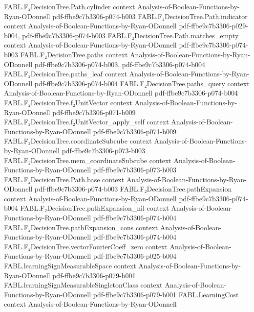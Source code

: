 \begin{theorem}
\proofstep
  {FABL.F₂DecisionTree.Path.cylinder}
  {context}
  {Analysis-of-Boolean-Functions-by-Ryan-ODonnell}
  {pdf-ffbe9c7b3306-p074-b003}
\proofstep
  {FABL.F₂DecisionTree.Path.indicator}
  {context}
  {Analysis-of-Boolean-Functions-by-Ryan-ODonnell}
  {pdf-ffbe9c7b3306-p029-b004,
    pdf-ffbe9c7b3306-p074-b003}
\proofstep
  {FABL.F₂DecisionTree.Path.matches_empty}
  {context}
  {Analysis-of-Boolean-Functions-by-Ryan-ODonnell}
  {pdf-ffbe9c7b3306-p074-b003}
\proofstep
  {FABL.F₂DecisionTree.paths}
  {context}
  {Analysis-of-Boolean-Functions-by-Ryan-ODonnell}
  {pdf-ffbe9c7b3306-p074-b003,
    pdf-ffbe9c7b3306-p074-b004}
\proofstep
  {FABL.F₂DecisionTree.paths_leaf}
  {context}
  {Analysis-of-Boolean-Functions-by-Ryan-ODonnell}
  {pdf-ffbe9c7b3306-p074-b004}
\proofstep
  {FABL.F₂DecisionTree.paths_query}
  {context}
  {Analysis-of-Boolean-Functions-by-Ryan-ODonnell}
  {pdf-ffbe9c7b3306-p074-b004}
\proofstep
  {FABL.F₂DecisionTree.f₂UnitVector}
  {context}
  {Analysis-of-Boolean-Functions-by-Ryan-ODonnell}
  {pdf-ffbe9c7b3306-p071-b009}
\proofstep
  {FABL.F₂DecisionTree.f₂UnitVector_apply_self}
  {context}
  {Analysis-of-Boolean-Functions-by-Ryan-ODonnell}
  {pdf-ffbe9c7b3306-p071-b009}
\proofstep
  {FABL.F₂DecisionTree.coordinateSubcube}
  {context}
  {Analysis-of-Boolean-Functions-by-Ryan-ODonnell}
  {pdf-ffbe9c7b3306-p073-b003}
\proofstep
  {FABL.F₂DecisionTree.mem_coordinateSubcube}
  {context}
  {Analysis-of-Boolean-Functions-by-Ryan-ODonnell}
  {pdf-ffbe9c7b3306-p073-b003}
\proofstep
  {FABL.F₂DecisionTree.Path.base}
  {context}
  {Analysis-of-Boolean-Functions-by-Ryan-ODonnell}
  {pdf-ffbe9c7b3306-p074-b003}
\proofstep
  {FABL.F₂DecisionTree.pathExpansion}
  {context}
  {Analysis-of-Boolean-Functions-by-Ryan-ODonnell}
  {pdf-ffbe9c7b3306-p074-b004}
\proofstep
  {FABL.F₂DecisionTree.pathExpansion_nil}
  {context}
  {Analysis-of-Boolean-Functions-by-Ryan-ODonnell}
  {pdf-ffbe9c7b3306-p074-b004}
\proofstep
  {FABL.F₂DecisionTree.pathExpansion_cons}
  {context}
  {Analysis-of-Boolean-Functions-by-Ryan-ODonnell}
  {pdf-ffbe9c7b3306-p074-b004}
\proofstep
  {FABL.F₂DecisionTree.vectorFourierCoeff_zero}
  {context}
  {Analysis-of-Boolean-Functions-by-Ryan-ODonnell}
  {pdf-ffbe9c7b3306-p025-b004}
\proofstep
  {FABL.learningSignMeasurableSpace}
  {context}
  {Analysis-of-Boolean-Functions-by-Ryan-ODonnell}
  {pdf-ffbe9c7b3306-p079-b001}
\proofstep
  {FABL.learningSignMeasurableSingletonClass}
  {context}
  {Analysis-of-Boolean-Functions-by-Ryan-ODonnell}
  {pdf-ffbe9c7b3306-p079-b001}
\proofstep
  {FABL.LearningCost}
  {context}
  {Analysis-of-Boolean-Functions-by-Ryan-ODonnell}

\end{theorem}
